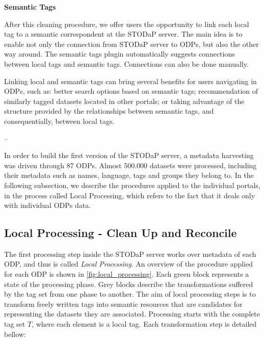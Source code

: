 \noindent\textbf{Semantic Tags}

After this cleaning procedure, we offer users the opportunity to link each local tag to a semantic correspondent at the STODaP server.
The main idea is to enable not only the connection from STODaP server to ODPs, but also the other way around.
The semantic tags plugin automatically suggests connections between local tags and semantic tags.
Connections can also be done manually.

Linking local and semantic tags can bring several benefits for users navigating in ODPs, such as: better search options based on semantic tags; recommendation of similarly tagged datasets located in other portals; or taking advantage of the structure provided by the relationships between semantic tags, and consequentially, between local tags.

--

In order to build the first version of the STODaP server, a metadata harvesting was driven through 87 ODPs.
Almost 500.000 datasets were processed, including their metadata such as names, language, tags and groups they belong to.
In the following subsection, we describe the procedures applied to the individual portals, in the process called Local Processing, which refers to the fact that it deals only with individual ODPs data.


\subsection{Local Processing - Clean Up and Reconcile}
\label{sec:local_building}

The first processing step inside the STODaP server works over metadata of each ODP, and thus is called \emph{Local Processing}.
An overview of the procedure applied for each ODP is shown in \autoref{fig:local_processing}.
Each green block represents a state of the processing phase. %
Grey blocks describe the transformations suffered by the tag set from one phase to another.
The aim of local processing steps is to transform freely written tags into semantic resources that are candidates for representing the datasets they are associated.
Processing starts with the complete tag set $T$, where each element is a local tag.
Each transformation step is detailed bellow:

